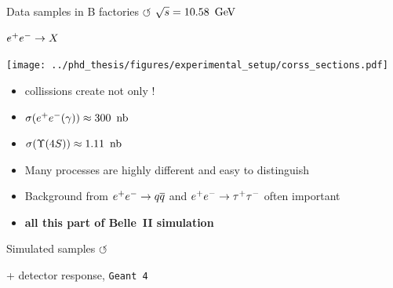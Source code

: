 \documentclass[xcolor=dvipsnames]{beamer}
\begin{document}
\begin{frame}{Data samples in B factories \hyperlink{frame:A}{$\circlearrowleft$}}
   \scriptsize\centering
   \textbf{$\sqrt{s} = 10.58~\mathrm{\,Ge\kern -0.1em V}$}
   
   $e^+e^-\rightarrow X$

   \texttt{[image: ../phd\_thesis/figures/experimental\_setup/corss\_sections.pdf]}
   \begin{itemize}
      \item \epem collissions create not only \FourS!
      \item[] $\sigma({e^+e^-(\gamma)}) \approx 300~{\rm \,nb}$
      \item[] $\sigma({\FourS}) \approx 1.11~\nb$
      \item Many processes are highly different and easy to distinguish
      \item Background from $e^+e^-\rightarrow q\overline q$ and $e^+e^-\rightarrow\tau^+\tau^-$ often important
      \item[\ra] \textbf{all this part of Belle~II simulation}
   \end{itemize}
\end{frame}

\begin{frame}{Simulated samples \hyperlink{frame:A}{$\circlearrowleft$}}
   \centering

   + detector response, \texttt{Geant 4}
\end{frame}
\end{document}
